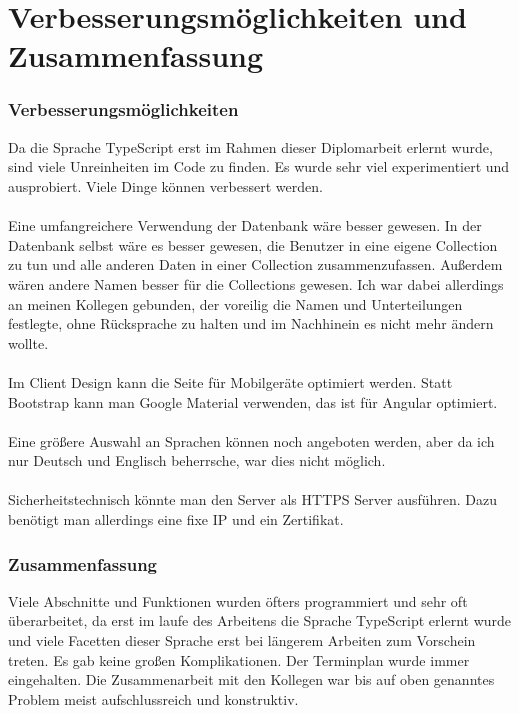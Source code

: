 \section{Verbesserungsmöglichkeiten und Zusammenfassung}
\label{sec:verbesserung-und-zusammenfassung}

\subsubsection{Verbesserungsmöglichkeiten}
\label{sec:verbesserung}
Da die Sprache TypeScript erst im Rahmen dieser Diplomarbeit erlernt wurde, sind viele Unreinheiten im Code zu finden. Es wurde sehr viel experimentiert und ausprobiert. Viele Dinge können verbessert werden. \\ \\
Eine umfangreichere Verwendung der Datenbank wäre besser gewesen. In der Datenbank selbst wäre es besser gewesen, die Benutzer in eine eigene Collection zu tun und alle anderen Daten in einer Collection zusammenzufassen. Außerdem wären andere Namen besser für die Collections gewesen. Ich war dabei allerdings an meinen Kollegen gebunden, der voreilig die Namen und Unterteilungen festlegte, ohne Rücksprache zu halten und im Nachhinein es nicht mehr ändern wollte. \\ \\
Im Client Design kann die Seite für Mobilgeräte optimiert werden. Statt Bootstrap kann man Google Material verwenden, das ist für Angular optimiert. \\ \\
Eine größere Auswahl an Sprachen können noch angeboten werden, aber da ich nur Deutsch und Englisch beherrsche, war dies nicht möglich. \\ \\
Sicherheitstechnisch könnte man den Server als \ac{HTTPS} Server ausführen. Dazu benötigt man allerdings eine fixe IP und ein Zertifikat.

\subsubsection{Zusammenfassung}
\label{sec:zusammenfassung}
Viele Abschnitte und Funktionen wurden öfters programmiert und sehr oft überarbeitet, da erst im laufe des Arbeitens die Sprache TypeScript erlernt wurde und viele Facetten dieser Sprache erst bei längerem Arbeiten zum Vorschein treten. Es gab keine großen Komplikationen. Der Terminplan wurde immer eingehalten. Die Zusammenarbeit mit den Kollegen war bis auf oben genanntes Problem meist aufschlussreich und konstruktiv.